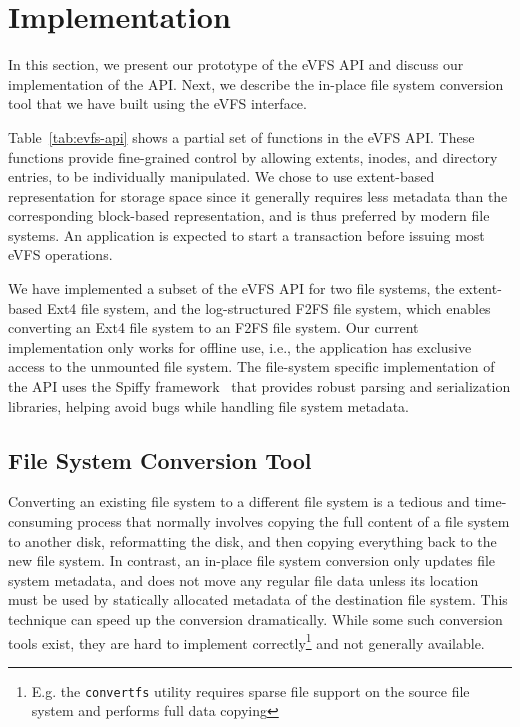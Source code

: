\vspace{-0.7em}
\section{Implementation\label{sec:Implementation}}
\vspace{-0.4em}

In this section, we present our prototype of the eVFS API and discuss our implementation of the API. Next, we describe the in-place file system conversion tool that we have built using the eVFS interface.

Table~\ref{tab:evfs-api} shows a partial set of functions in the eVFS API. These functions provide fine-grained control by allowing extents, inodes, and directory entries, to be individually manipulated. We chose to use extent-based representation for storage space since it generally requires less metadata than the corresponding block-based representation, and is thus preferred by modern file systems. An application is expected to start a transaction before issuing most eVFS operations. 


We have implemented a subset of the eVFS API for two file systems, the extent-based Ext4 file system, and the log-structured F2FS file system, which enables converting an Ext4 file system to an F2FS file system. Our current implementation only works for offline use, i.e., the application has exclusive access to the unmounted file system. The file-system specific implementation of the API uses the Spiffy framework~\cite{sun2018spiffy} that provides robust parsing and serialization libraries, helping avoid bugs while handling file system metadata.

\vspace{-0.4em}
\subsection{File System Conversion Tool\label{subsec:conversion_tool}}
\vspace{-0.1em}

Converting an existing file system to a different file system is a tedious and time-consuming process that normally involves copying the full content of a file system to another disk, reformatting the disk, and then copying everything back to the new file system. In contrast, an in-place file system conversion only updates file system metadata, and does not move any regular file data unless its location must be used by statically allocated metadata of the destination file system. This technique can speed up the conversion dramatically. While some such conversion tools exist, they are hard to implement correctly\footnote{E.g. the \texttt{convertfs} utility \cite{convertfs} requires sparse file support on the source file system and performs full data copying} and not generally available.

